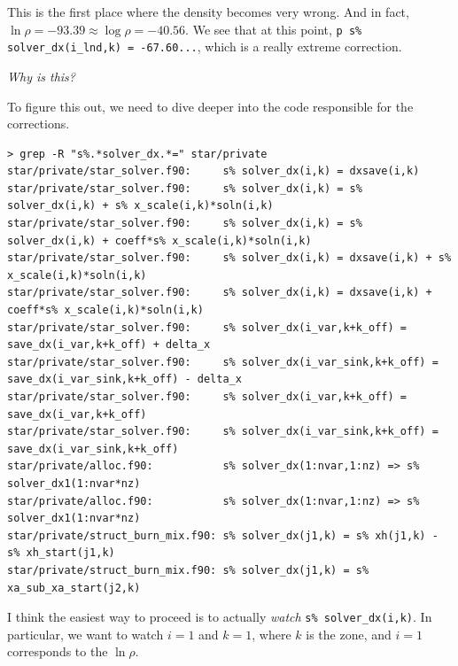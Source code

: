 \documentclass[a4paper,10pt]{article}
\begin{document}
This is the first place where the density becomes very wrong. And in fact, \(\ln \rho = -93.39 \approx \log \rho = -40.56\). We see that at this point, \lstinline[style=output, breaklines=true]|p s% solver_dx(i_lnd,k) = -67.60...|, which is a really extreme correction.

\emph{Why is this?}

To figure this out, we need to dive deeper into the code responsible for the corrections.
\begin{verbatim}
> grep -R "s%.*solver_dx.*=" star/private
star/private/star_solver.f90:     s% solver_dx(i,k) = dxsave(i,k)
star/private/star_solver.f90:     s% solver_dx(i,k) = s% solver_dx(i,k) + s% x_scale(i,k)*soln(i,k)
star/private/star_solver.f90:     s% solver_dx(i,k) = s% solver_dx(i,k) + coeff*s% x_scale(i,k)*soln(i,k)
star/private/star_solver.f90:     s% solver_dx(i,k) = dxsave(i,k) + s% x_scale(i,k)*soln(i,k)
star/private/star_solver.f90:     s% solver_dx(i,k) = dxsave(i,k) + coeff*s% x_scale(i,k)*soln(i,k)
star/private/star_solver.f90:     s% solver_dx(i_var,k+k_off) = save_dx(i_var,k+k_off) + delta_x
star/private/star_solver.f90:     s% solver_dx(i_var_sink,k+k_off) = save_dx(i_var_sink,k+k_off) - delta_x
star/private/star_solver.f90:     s% solver_dx(i_var,k+k_off) = save_dx(i_var,k+k_off)
star/private/star_solver.f90:     s% solver_dx(i_var_sink,k+k_off) = save_dx(i_var_sink,k+k_off)
star/private/alloc.f90:           s% solver_dx(1:nvar,1:nz) => s% solver_dx1(1:nvar*nz)
star/private/alloc.f90:           s% solver_dx(1:nvar,1:nz) => s% solver_dx1(1:nvar*nz)
star/private/struct_burn_mix.f90: s% solver_dx(j1,k) = s% xh(j1,k) - s% xh_start(j1,k)
star/private/struct_burn_mix.f90: s% solver_dx(j1,k) = s% xa_sub_xa_start(j2,k)
\end{verbatim}

I think the easiest way to proceed is to actually \emph{watch} \lstinline[style=output, breaklines=true]|s% solver_dx(i,k)|. In particular, we want to watch \(i = 1\) and \(k = 1\), where \(k\) is the zone, and \(i = 1\) corresponds to the \(\ln \rho \).
\end{document}
